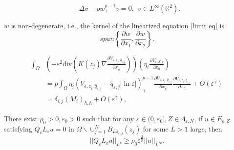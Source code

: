 \documentclass[10pt,a4paper]{amsart}
\begin{document}
\begin{equation}\label{limit eq}
-\Delta v-pw^{p-1}_+v=0, \ \ v\in L^{\infty}(\mathbb{R}^2).
\end{equation}

\begin{proposition}\label{Non-degenerate}
$ w $ is non-degenerate, i.e., the kernel of the linearized equation \eqref{limit eq} is $$ span\left \{\frac{\partial w}{\partial x_1}, \frac{\partial w}{\partial x_2}\right \}. $$
\end{proposition}

\begin{equation}\label{coef of C}
\begin{split}
\int_{\Omega}&\left( -\varepsilon^2\text{div}\left (K(z_j)\nabla   \frac{\partial V_{\varepsilon, z_j, \hat{q}_{\varepsilon,j}}}{\partial x_{\tilde{h}}}\right )\right)\left( \eta_i\frac{\partial V_{\varepsilon, Z,i}}{\partial x_\hbar}\right)\\
&=p\int_{\Omega}\eta_i\left (V_{\varepsilon, z_j, \hat{q}_{\varepsilon,j}}-\hat{q}_{\varepsilon,j}|\ln\varepsilon|\right )^{p-1}_+ \frac{\partial V_{\varepsilon, z_j, \hat{q}_{\varepsilon,j}}}{\partial x_{\tilde{h}}}\frac{\partial V_{\varepsilon, z_i, \hat{q}_{\varepsilon,i}}}{\partial x_\hbar}+O\left( \varepsilon^\gamma\right)\\
&=\delta_{i,j}(M_{i})_{\tilde{h},\hbar}+O\left( \varepsilon^\gamma\right) ,
\end{split}
\end{equation}

\begin{proposition}\label{coercive esti}
There exist  $ \rho_0>0, \varepsilon_0>0 $ such that for any $ \varepsilon\in(0,\varepsilon_0],  Z\in \Lambda_{\varepsilon, N} $, if $ u\in E_{\varepsilon,Z} $ satisfying $ Q_\varepsilon L_\varepsilon u=0 $ in $ \Omega\backslash\cup_{j=1}^NB_{Ls_{\varepsilon,j}}(z_j) $ for some $ L>1 $ large, then
\begin{equation*}
||Q_\varepsilon L_\varepsilon u||_{L^p}\geq \rho_0\varepsilon^{\frac{2}{p}}||u||_{L^\infty}. 
\end{equation*}
\end{proposition}
\end{document}
